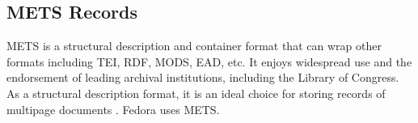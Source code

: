 \subsection{METS Records}
METS is a structural description and container format that can wrap other formats including TEI, RDF, MODS, EAD, etc. It enjoys widespread use and the endorsement of leading archival institutions, including the Library of Congress. As a structural description format, it is an ideal choice for storing records of multipage documents \needcite. Fedora uses METS.
